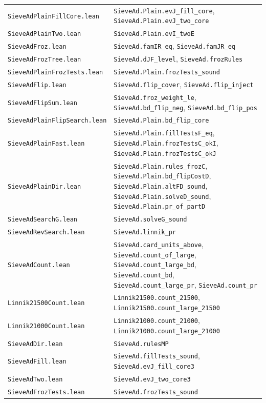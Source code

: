 \documentclass[11pt]{article}
\theoremstyle{definition}
\newcommand{\lean}[1]{\texttt{#1}}
\newcommand{\file}[1]{\nolinkurl{#1}}
\begin{document}
{\begin{longtable}{@{}l>{\raggedright\arraybackslash}p{}@{}}
\file{SieveAdPlainFillCore.lean} & \lean{SieveAd.Plain.evJ\_fill\_core}, \lean{SieveAd.Plain.evJ\_two\_core} \\
\file{SieveAdPlainTwo.lean} & \lean{SieveAd.Plain.evI\_twoE} \\
\file{SieveAdFroz.lean} & \lean{SieveAd.famIR\_eq}, \lean{SieveAd.famJR\_eq} \\
\file{SieveAdFrozTree.lean} & \lean{SieveAd.dJF\_level}, \lean{SieveAd.frozRules} \\
\file{SieveAdPlainFrozTests.lean} & \lean{SieveAd.Plain.frozTests\_sound} \\
\file{SieveAdFlip.lean} & \lean{SieveAd.flip\_cover}, \lean{SieveAd.flip\_inject} \\
\file{SieveAdFlipSum.lean} & \lean{SieveAd.froz\_weight\_le}, \lean{SieveAd.bd\_flip\_neg}, \lean{SieveAd.bd\_flip\_pos}
\\
\file{SieveAdPlainFlipSearch.lean} & \lean{SieveAd.Plain.bd\_flip\_core} \\
\file{SieveAdPlainFast.lean} & \lean{SieveAd.Plain.fillTestsF\_eq}, \lean{SieveAd.Plain.frozTestsC\_okI},
\lean{SieveAd.Plain.frozTestsC\_okJ} \\
\file{SieveAdPlainDir.lean} & \lean{SieveAd.Plain.rules\_frozC}, \lean{SieveAd.Plain.bd\_flipCostD},
\lean{SieveAd.Plain.altFD\_sound}, \lean{SieveAd.Plain.solveD\_sound}, \lean{SieveAd.Plain.pr\_of\_partD} \\
\file{SieveAdSearchG.lean} & \lean{SieveAd.solveG\_sound} \\
\file{SieveAdRevSearch.lean} & \lean{SieveAd.linnik\_pr} \\
\file{SieveAdCount.lean} & \lean{SieveAd.card\_units\_above}, \lean{SieveAd.count\_of\_large},
\lean{SieveAd.count\_large\_bd}, \lean{SieveAd.count\_bd}, \lean{SieveAd.count\_large\_pr}, \lean{SieveAd.count\_pr} \\
\file{Linnik21500Count.lean} & \lean{Linnik21500.count\_21500}, \lean{Linnik21500.count\_large\_21500} \\
\file{Linnik21000Count.lean} & \lean{Linnik21000.count\_21000}, \lean{Linnik21000.count\_large\_21000} \\
\file{SieveAdDir.lean} & \lean{SieveAd.rulesMP} \\
\file{SieveAdFill.lean} & \lean{SieveAd.fillTests\_sound}, \lean{SieveAd.evJ\_fill\_core3} \\
\file{SieveAdTwo.lean} & \lean{SieveAd.evJ\_two\_core3} \\
\file{SieveAdFrozTests.lean} & \lean{SieveAd.frozTests\_sound} \\

\end{longtable}}
\end{document}
